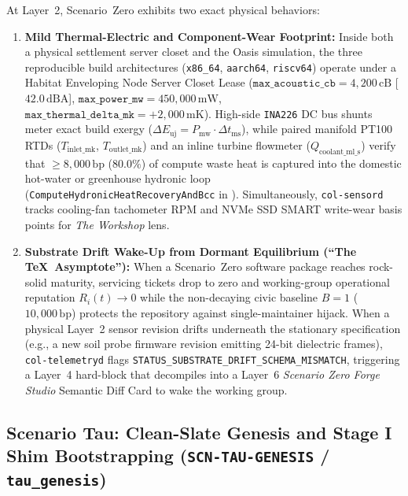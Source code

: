 At Layer~2, Scenario~Zero exhibits two exact physical behaviors:
\begin{enumerate}
    \item \textbf{Mild Thermal-Electric and Component-Wear Footprint:} Inside both a physical settlement server closet and the Oasis simulation, the three reproducible build architectures (\texttt{x86\_64}, \texttt{aarch64}, \texttt{riscv64}) operate under a Habitat Enveloping Node Server Closet Lease ($\mathtt{max\_acoustic\_cb} = 4{,}200\,\mathrm{cB}$ [$42.0\,\mathrm{dBA}$], $\mathtt{max\_power\_mw} = 450{,}000\,\mathrm{mW}$, $\mathtt{max\_thermal\_delta\_mk} = +2{,}000\,\mathrm{mK}$). High-side \texttt{INA226} DC bus shunts meter exact build exergy ($\Delta E_{\mathrm{uj}} = P_{\mathrm{mw}}\cdot\Delta t_{\mathrm{ms}}$), while paired manifold PT100 RTDs ($T_{\mathrm{inlet\_mk}}$, $T_{\mathrm{outlet\_mk}}$) and an inline turbine flowmeter ($Q_{\mathrm{coolant\_ml\_s}}$) verify that $\ge 8{,}000\,\mathrm{bp}$ ($80.0\%$) of compute waste heat is captured into the domestic hot-water or greenhouse hydronic loop (\texttt{ComputeHydronicHeatRecoveryAndBcc} in ). Simultaneously, \texttt{col-sensord} tracks cooling-fan tachometer RPM and NVMe SSD SMART write-wear basis points for \textit{The Workshop} lens.
    \item \textbf{Substrate Drift Wake-Up from Dormant Equilibrium (``The \TeX\ Asymptote''):} When a Scenario~Zero software package reaches rock-solid maturity, servicing tickets drop to zero and working-group operational reputation $R_i(t) \to 0$ while the non-decaying civic baseline $B = 1$ ($10{,}000\,\mathrm{bp}$) protects the repository against single-maintainer hijack. When a physical Layer~2 sensor revision drifts underneath the stationary specification (e.g., a new soil probe firmware revision emitting 24-bit dielectric frames), \texttt{col-telemetryd} flags \texttt{STATUS\_SUBSTRATE\_DRIFT\_SCHEMA\_MISMATCH}, triggering a Layer~4 hard-block that decompiles into a Layer~6 \textit{Scenario Zero Forge Studio} Semantic Diff Card to wake the working group.
\end{enumerate}

\subsection{Scenario Tau: Clean-Slate Genesis and Stage I Shim Bootstrapping (\texttt{SCN-TAU-GENESIS} / \texttt{tau\_genesis})}

